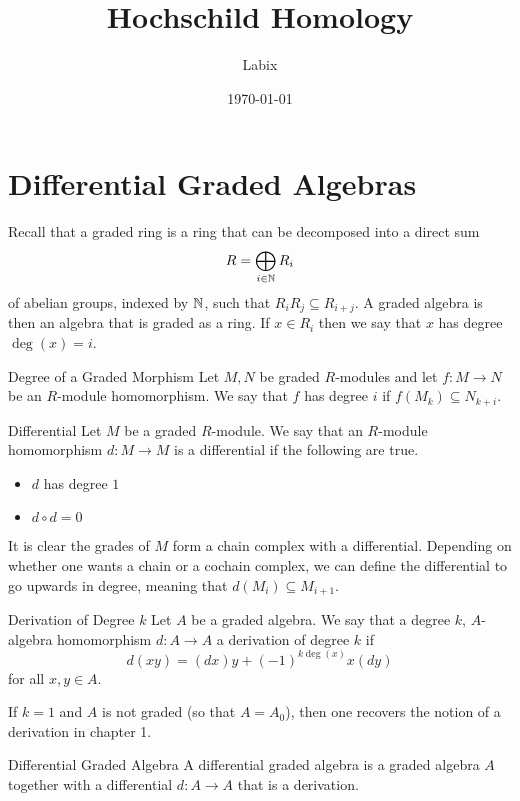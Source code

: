 \documentclass[a4paper]{article}
\title{Hochschild Homology}
\author{Labix}
\date{\today}
\begin{document}
\maketitle
\begin{abstract}
\end{abstract}
\pagebreak
\tableofcontents
\pagebreak

\section{Differential Graded Algebras}
Recall that a graded ring is a ring that can be decomposed into a direct sum $$R=\bigoplus_{i\in\mathbb{N}}R_i$$ of abelian groups, indexed by $\mathbb{N}$, such that $R_iR_j\subseteq R_{i+j}$. A graded algebra is then an algebra that is graded as a ring. If $x\in R_i$ then we say that $x$ has degree $\deg(x)=i$. 

\begin{defn}{Degree of a Graded Morphism}{} Let $M,N$ be graded $R$-modules and let $f:M\to N$ be an $R$-module homomorphism. We say that $f$ has degree $i$ if $f(M_k)\subseteq N_{k+i}$. 
\end{defn}

\begin{defn}{Differential}{} Let $M$ be a graded $R$-module. We say that an $R$-module homomorphism $d:M\to M$ is a differential if the following are true. 
\begin{itemize}
\item $d$ has degree $1$
\item $d\circ d=0$
\end{itemize}
\end{defn}

It is clear the grades of $M$ form a chain complex with a differential. Depending on whether one wants a chain or a cochain complex, we can define the differential to go upwards in degree, meaning that $d(M_i)\subseteq M_{i+1}$. 

\begin{defn}{Derivation of Degree $k$}{} Let $A$ be a graded algebra. We say that a degree $k$, $A$-algebra homomorphism $d:A\to A$ a derivation of degree $k$ if $$d(xy)=(dx)y+(-1)^{k\deg(x)}x(dy)$$ for all $x,y\in A$. 
\end{defn}

If $k=1$ and $A$ is not graded (so that $A=A_0$), then one recovers the notion of a derivation in chapter 1. 

\begin{defn}{Differential Graded Algebra}{} A differential graded algebra is a graded algebra $A$ together with a differential $d:A\to A$ that is a derivation. 
\end{defn}
\end{document}
